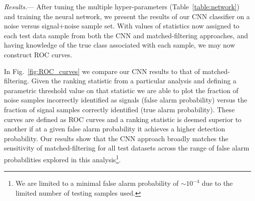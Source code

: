 \documentclass[%
showpacs,
 amsmath,amssymb,
 aps,
 twocolumn,
 prl,
 reprint,
floatfix,
]{revtex4-1}
\newcommand{\optsnr}{\rho_{\mathrm{opt}}}
\newcommand{\cnnsnreight}{97.88}
\begin{document}
%
%
%
%

%
%
\textit{Results.}---
%
%
After tuning the multiple hyper-parameters (Table~\ref{table:network}) and
training the neural network, we present the results of our \ac{CNN} classifier
on a noise versus signal+noise sample set. With values of statistics now
assigned to each test data sample from both the \ac{CNN} and matched-filtering
approaches, and having knowledge of the true class associated with each sample,
we may now construct \ac{ROC} curves. 

%
%

%
%
In Fig.~\ref{fig:ROC_curves} we compare our \ac{CNN} results to that of
matched-filtering. Given the ranking statistic from a particular analysis and
defining a parametric threshold value on that statistic we are able to plot the
fraction of noise samples incorrectly identified as signals (false alarm
probability) versus the fraction of signal samples correctly identified (true
alarm probability). These curves are defined as \ac{ROC} curves and a ranking
statistic is deemed superior to another if at a given false alarm probability
it achieves a higher detection probability. Our results show that the \ac{CNN}
approach {\color{red}broadly matches the sensitivity of matched-filtering for all test
datasets across the range of false alarm probabilities explored in this
analysis\footnote{We are limited to a minimal false alarm probability of $\sim
10^{-4}$ due to the limited number of testing samples used.}}.
\end{document}

